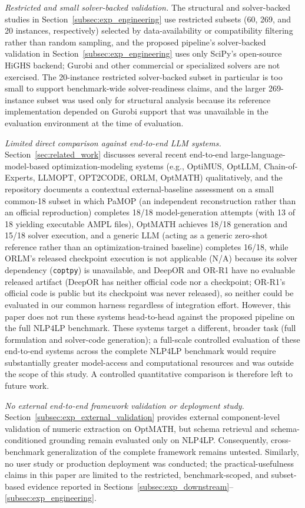 \documentclass[pdflatex,sn-basic,Numbered]{sn-jnl}
\begin{document}
\emph{Restricted and small solver-backed validation.} The structural and solver-backed studies in Section~\ref{subsec:exp_engineering} use restricted subsets (60, 269, and 20 instances, respectively) selected by data-availability or compatibility filtering rather than random sampling, and the proposed pipeline's solver-backed validation in Section~\ref{subsec:exp_engineering} uses only SciPy's open-source HiGHS backend; Gurobi and other commercial or specialized solvers are not exercised. The 20-instance restricted solver-backed subset in particular is too small to support benchmark-wide solver-readiness claims, and the larger 269-instance subset was used only for structural analysis because its reference implementation depended on Gurobi support that was unavailable in the evaluation environment at the time of evaluation.

\emph{Limited direct comparison against end-to-end LLM systems.} Section~\ref{sec:related_work} discusses several recent end-to-end large-language-model-based optimization-modeling systems (e.g., OptiMUS, OptLLM, Chain-of-Experts, LLMOPT, OPT2CODE, ORLM, OptMATH) qualitatively, and the repository documents a contextual external-baseline assessment on a small common-18 subset in which PaMOP (an independent reconstruction rather than an official reproduction) completes 18/18 model-generation attempts (with 13 of 18 yielding executable AMPL files), OptMATH achieves 18/18 generation and 15/18 solver execution, and a generic LLM (acting as a generic zero-shot reference rather than an optimization-trained baseline) completes 16/18, while ORLM's released checkpoint execution is not applicable (N/A) because its solver dependency (\texttt{coptpy}) is unavailable, and DeepOR and OR-R1 have no evaluable released artifact (DeepOR has neither official code nor a checkpoint; OR-R1's official code is public but its checkpoint was never released), so neither could be evaluated in our common harness regardless of integration effort. However, this paper does not run these systems head-to-head against the proposed pipeline on the full \textsc{NLP4LP} benchmark. These systems target a different, broader task (full formulation and solver-code generation); a full-scale controlled evaluation of these end-to-end systems across the complete \textsc{NLP4LP} benchmark would require substantially greater model-access and computational resources and was outside the scope of this study. A controlled quantitative comparison is therefore left to future work.

\emph{No external end-to-end framework validation or deployment study.} Section~\ref{subsec:exp_external_validation} provides external component-level validation of numeric extraction on OptMATH, but schema retrieval and schema-conditioned grounding remain evaluated only on NLP4LP. Consequently, cross-benchmark generalization of the complete framework remains untested. Similarly, no user study or production deployment was conducted; the practical-usefulness claims in this paper are limited to the restricted, benchmark-scoped, and subset-based evidence reported in Sections~\ref{subsec:exp_downstream}--\ref{subsec:exp_engineering}.
\end{document}
